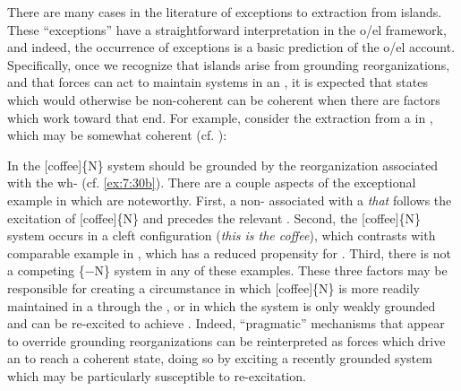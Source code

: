   \ea\label{ex:7:29}
  \label{ex:7:29a}
  \label{ex:7:29b}
  \label{ex:7:29c}
  \z
  \z
  
  There are many cases in the literature of exceptions to extraction from islands. These “exceptions” have a straightforward interpretation in the o/el framework, and indeed, the occurrence of exceptions is a basic prediction of the o/el account. Specifically, once we recognize that islands arise from grounding reorganizations, and that  forces can act to maintain systems in an , it is expected that states which would otherwise be non-coherent can be coherent when there are factors which work toward that end. For example, consider the extraction from a  in , which may be somewhat coherent (cf. \citep{Erteschik-ShirLappin1979,Truswell2011}):

\ea  \label{ex:7:30}
\z
\z

In  the [coffee]\{N\} system should be grounded by the reorganization associated with the wh- (cf. \ref{ex:7:30b}). There are a couple aspects of the exceptional example in  which are noteworthy. First, a non- associated with a \textit{that}  follows the excitation of [coffee]\{N\} and precedes the relevant . Second, the [coffee]\{N\} system occurs in a cleft configuration (\textit{this is the coffee}), which contrasts with comparable example in , which has a reduced propensity for . Third, there is not a competing \{−N\} system in any of these examples. These three factors may be responsible for creating a circumstance in which [coffee]\{N\} is more readily maintained in a  through the , or in which the system is only weakly grounded and can be re-excited to achieve . Indeed, “pragmatic” mechanisms that appear to override grounding reorganizations can be reinterpreted as forces which drive an  to reach a coherent state, doing so by exciting a recently grounded system which may be particularly susceptible to re-excitation.

